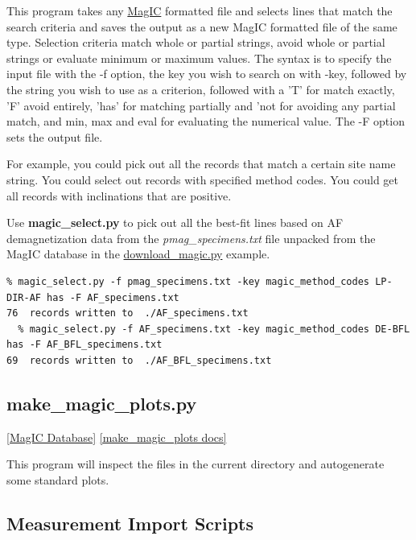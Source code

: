 \documentclass[11pt]{book}
\begin{document}
{{This program takes any \href{#MagIC}{MagIC} formatted file and selects lines that match the search criteria and saves the output as a new MagIC formatted file of the same type.  Selection criteria match whole or partial strings, avoid whole or partial strings or evaluate minimum or maximum values.    The syntax is to specify the input file with the -f option, the key you wish to search on with -key, followed by the string you wish to use as a criterion, followed with a 'T' for match exactly, 'F' avoid entirely, 'has' for matching partially and 'not for avoiding any partial match, and min, max and eval for evaluating the numerical value.  The -F option sets the output file.

  For example, you could pick out all the records that match a certain site name string.  You could select out records with specified method codes.  You could get all records with inclinations that are positive.

  Use {\bf magic\_select.py} to pick out all the best-fit lines based on AF demagnetization data from the {\it pmag\_specimens.txt} file unpacked from the MagIC database in the \href{#download_magic.py}{download\_magic.py} example.

  \begin{verbatim}
% magic_select.py -f pmag_specimens.txt -key magic_method_codes LP-DIR-AF has -F AF_specimens.txt
76  records written to  ./AF_specimens.txt
  % magic_select.py -f AF_specimens.txt -key magic_method_codes DE-BFL has -F AF_BFL_specimens.txt
69  records written to  ./AF_BFL_specimens.txt

 \end{verbatim}

\subsection{make\_magic\_plots.py}
\href{#MagICDatabase}{[MagIC Database]}
\href{https://github.com/PmagPy/PmagPy/blob/master/programs/make_magic_plots.py}{[make\_magic\_plots docs]}

This program will inspect the files in the current directory and autogenerate some standard plots.

\subsection{Measurement Import Scripts}


}}
\end{document}

